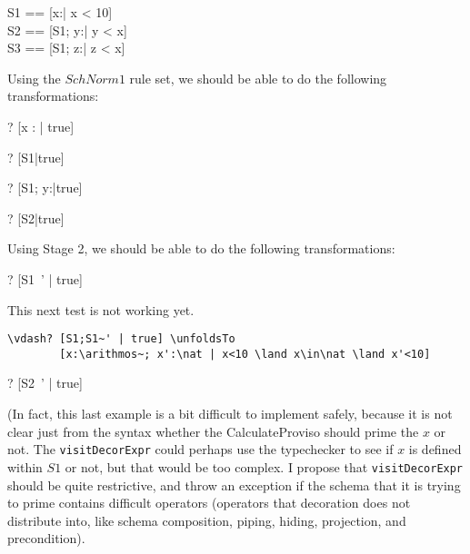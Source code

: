 \documentclass{article}
\begin{document}
\begin{zed}
  S1 == [x:\nat | x < 10] \\
  S2 == [S1; y:\nat | y < x] \\
  S3 == [S1; z:\nat | z < x]
\end{zed}

Using the $SchNorm1$ rule set, we should be able to
do the following transformations:

\begin{zed}
  \vdash? [x : \nat | true] 
\end{zed}
\begin{zed}
  \vdash? [S1|true] 
\end{zed}
\begin{zed}
  \vdash? [S1; y:\nat|true] 
\end{zed}
\begin{zed}
  \vdash? [S2|true] 
\end{zed}

Using Stage 2, we should be able to
do the following transformations:

\begin{zed}
\vdash? [S1~' | true] 
\end{zed}

This next test is not working yet.
\begin{verbatim}
\vdash? [S1;S1~' | true] \unfoldsTo
        [x:\arithmos~; x':\nat | x<10 \land x\in\nat \land x'<10]
\end{verbatim}

\begin{zed}
\vdash? [S2~' | true] 
\end{zed}

(In fact, this last example is a bit difficult to implement safely,
because it is not clear just from the syntax whether the CalculateProviso
should prime the $x$ or not.  The \verb!visitDecorExpr! could perhaps
use the typechecker to see if $x$ is defined within $S1$ or not, but
that would be too complex.  I propose that \verb!visitDecorExpr! should
be quite restrictive, and throw an exception if the schema that it
is trying to prime contains difficult operators (operators that
decoration does not distribute into, like schema composition,
piping, hiding, projection, and precondition).
\end{document}
